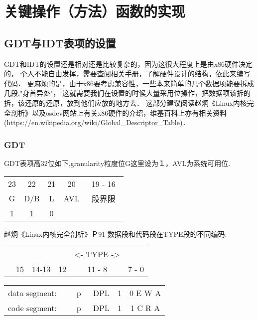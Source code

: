 \chapter{关键操作（方法）函数的实现} 

\section{GDT与IDT表项的设置}
GDT和IDT的设置还是相对还是比较复杂的，因为这很大程度上是由x86硬件决定的，
个人不能自由发挥，需要查阅相关手册，了解硬件设计的结构，依此来编写代码．
更麻烦的是，由于x86要考虑兼容性，一些本来简单的几个数据项能要拆成几段,"身首异处"，
这就需要我们在设置的时候大量采用位操作，把数据项该拆的拆，该还原的还原，放到他们应放的地方去．
这部分建议阅读赵炯《Linux内核完全剖析》以及osdev网站上有关x86硬件的介绍，维基百科上亦有相关资料
(https://en.wikipedia.org/wiki/Global\_Descriptor\_Table)．
\subsection{GDT}
GDT表项高32位如下,granularity粒度位G这里设为１，AVL为系统可用位.

\begin{tabular}{|c|c|c|c|c|}%
    \midrule
    23 & 22 & 21 & 20 & 19 - 16\tabularnewline
    G  &D/B & L  &AVL & 段界限　\tabularnewline
    1  &1   & 0  &   &        \tabularnewline
    \bottomrule
\end{tabular}

赵炯《Linux内核完全剖析》Ｐ91 数据段和代码段在TYPE段的不同编码:


\begin{tabular}{|c|c|c|c|c|}%
    \midrule
         &        &    &<-  TYPE ->& \tabularnewline 		
    　15 & 14-13  & 12 &   11 - 8   & 7 - 0\tabularnewline     
    \bottomrule
\end{tabular}


\begin{tabular}{|c|c|c|c|c|}%
    \midrule
    data segment:&　p　&  DPL  & 1 & 0 E W A   \tabularnewline 
    code segment:&　p　&  DPL  & 1 & 1 C R A   \tabularnewline    
    \bottomrule
\end{tabular}


